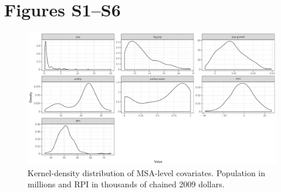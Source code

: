 \documentclass[draft]{agujournal}
\begin{document}
\section*{Figures S1--S6}

\begin{figure}[H]
\includegraphics[width=6in]{figures_si/msa_vars_distribution-1} \caption[Kernel-density distribution of MSA-level covariates]{Kernel-density distribution of MSA-level covariates. Population in millions and RPI in thousands of chained 2009 dollars.}\label{fig:msa_vars_distribution}
\end{figure}



\end{document}
